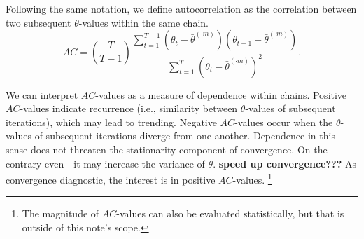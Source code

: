\documentclass[article]{jss}
\begin{document}
Following the same notation, we define autocorrelation as the correlation between two subsequent $\theta$-values within the same chain\footnotemark  \citep[p.~147]{lync07}. %
%
\begin{equation*}
AC = \left( \frac{T}{T-1} \right) \frac{\sum_{t=1}^{T-1}(\theta_t - \bar{\theta}^{(\cdot m)})(\theta_{t+1} - \bar{\theta}^{(\cdot m)})}{\sum_{t=1}^{T}(\theta_t - \bar{\theta}^{(\cdot m)})^2}.
\end{equation*}
%

We can interpret %
$AC$-values as a measure of dependence within chains. Positive $AC$-values indicate recurrence (i.e., similarity between $\theta$-values of subsequent iterations), which may lead to trending. Negative $AC$-values occur when the $\theta$-values of subsequent iterations diverge from one-another. Dependence in this sense does not threaten the stationarity component of convergence. %
On the contrary even---it may increase the variance of $\theta$. \textbf{speed up convergence???}  %
As convergence diagnostic, the interest is in positive $AC$-values.%
\footnote{The magnitude of $AC$-values can also be evaluated statistically, but that is outside of this note's scope.}

\end{document}
